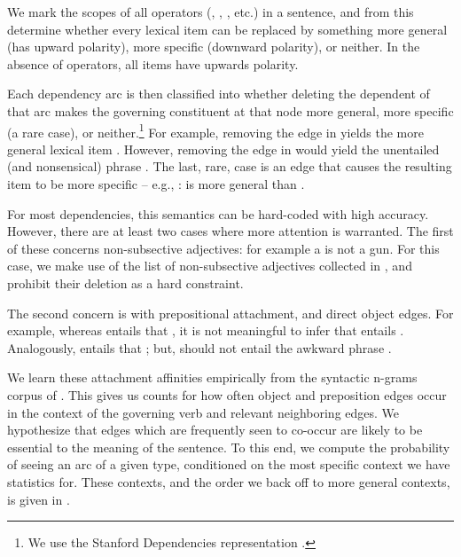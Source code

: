 We mark the scopes of all operators (, , ,
  etc.) in a sentence, and from this determine whether every lexical item
  can be replaced by something more general (has upward polarity),
  more specific (downward polarity), or neither.
In the absence of operators, all items have upwards polarity.

Each dependency arc is then classified into whether deleting the dependent
  of that arc makes the governing constituent at that node more general,
  more specific (a rare case), or neither.\footnote{
    We use the Stanford Dependencies representation 
      \cite{key:stanford-dependencies}.
  }
For example, removing the  edge in \hbox{} yields the
  more general lexical item .
However, removing the  edge in \hbox{} would yield the
  unentailed (and nonsensical) phrase .
The last, rare, case is an edge that causes the resulting item to be 
  more specific -- e.g., : 
  \hbox{} is more general than .

For most dependencies, this semantics can be hard-coded with high accuracy.
However, there are at least two cases where more attention is warranted.
The first of these concerns non-subsective adjectives: for example 
  a  is not a gun.
For this case, we make use of the list of non-subsective adjectives collected
  in , and prohibit their deletion as a
  hard constraint.

The second concern is with prepositional attachment, and direct object
  edges.
For example, whereas  entails
  that , it is not meaningful to infer that
   entails .
Analogously,  
  entails that ; but,  should not entail the
  awkward phrase .

We learn these attachment affinities empirically from the syntactic n-grams
  corpus of .
This gives us counts for how often object and preposition edges occur in the
  context of the governing verb and relevant neighboring edges.
We hypothesize that edges which are frequently seen to co-occur 
  are likely
  to be essential to the meaning of the sentence.
To this end, we compute the probability of seeing an arc of a given type,
  conditioned on the most specific context we have statistics for.
These contexts, and the order we back off to more general contexts,
  is given in .

